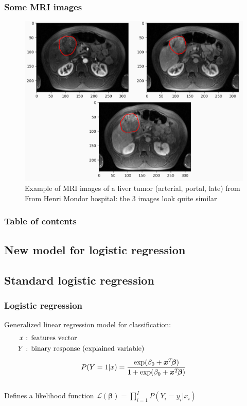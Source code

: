 \documentclass{beamer}
\begin{document}
\begin{frame}
    \frametitle{Some MRI images}
    \begin{figure}
        \centering
        \includegraphics[scale = 0.215]{images/HCC.png}
        \caption{Example of MRI images of a liver tumor (arterial, portal, late) from From Henri Mondor hospital: the 3 images look quite similar}
    \end{figure}
\end{frame}


\begin{frame}
    \frametitle{Table of contents}
    \tableofcontents
\end{frame}

\begin{frame}
    \section{New model for logistic regression}
\end{frame}

\subsection{Standard logistic regression}
\begin{frame}
    \frametitle{Logistic regression}
    Generalized linear regression model for classification:
    \begin{align}
    x &\text{ :  features vector} \hspace{5 cm} \phantom{1}\\
    Y &\text{ : binary response (explained variable)} \hspace{5 cm} \phantom{1}
\end{align}
$$P(Y = 1|x) = \frac{\exp(\beta_0 + \bm{x}^T\hspace{-2 pt}\bm{\beta})}{1 + \exp(\beta_0 + \bm{x}^T\hspace{-2 pt}\bm{\beta})}$$
\phantom{a}\\[10 pt]
    Defines a likelihood function $\mathcal{L}(\bm{\beta}) = \prod_{i = 1}^I P(Y_i = y_i|x_i)$ 

\end{frame}
\end{document}
